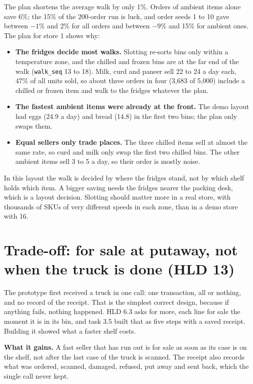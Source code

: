 The plan shortens the average walk by only 1\%. Orders of ambient items alone save 6\%; the 15\% of the 200-order run
is luck, and order seeds 1 to 10 gave between $-1$\% and 2\% for all orders and between $-9$\% and 15\% for ambient
ones. The plan for store 1 shows why:
\begin{itemize}
  \item \textbf{The fridges decide most walks.} Slotting re-sorts bins only within a temperature zone, and the chilled
    and frozen bins are at the far end of the walk (\texttt{walk\_seq} 13 to 18). Milk, curd and paneer sell 22 to 24
    a day each, 47\% of all units sold, so about three orders in four (3{,}683 of 5{,}000) include a chilled or frozen
    item and walk to the fridges whatever the plan.
  \item \textbf{The fastest ambient items were already at the front.} The demo layout had eggs (24.9 a day) and bread
    (14.8) in the first two bins; the plan only swaps them.
  \item \textbf{Equal sellers only trade places.} The three chilled items sell at almost the same rate, so curd and
    milk only swap the first two chilled bins. The other ambient items sell 3 to 5 a day, so their order is mostly noise.
\end{itemize}
In this layout the walk is decided by where the fridges stand, not by which shelf holds which item. A bigger saving
needs the fridges nearer the packing desk, which is a layout decision. Slotting should matter more in a real store,
with thousands of SKUs of very different speeds in each zone, than in a demo store with 16.

\section{Trade-off: for sale at putaway, not when the truck is done (HLD 13)}
\label{sec:m3-tradeoff}

The prototype first received a truck in one call: one transaction, all or nothing, and no record of the receipt. That
is the simplest correct design, because if anything fails, nothing happened. HLD 6.3 asks for more, each line for sale
the moment it is in its bin, and task 3.5 built that as five steps with a saved receipt. Building it showed what a
faster shelf costs.

\textbf{What it gains.} A fast seller that has run out is for sale as soon as its case is on the shelf, not after the
last case of the truck is scanned. The receipt also records what was ordered, scanned, damaged, refused, put away and
sent back, which the single call never kept.

